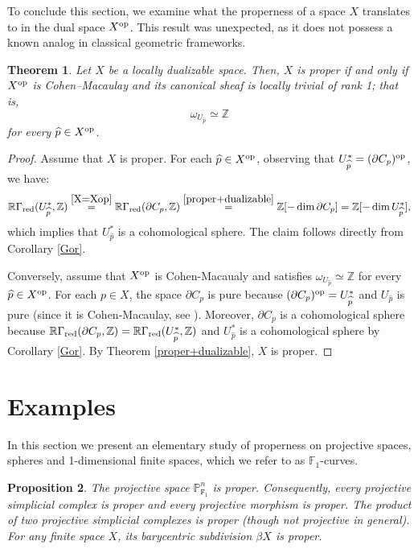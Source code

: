 \documentclass[amssymb,amscd,11pt,20pt]{amsart}
\newcommand{\FF}{{\mathtt F}}
\newcommand{\ZZ}{{\mathbb Z}}
\newcommand{\PP}{\mathbb P}
\newcommand{\RR}{\mathbb R}
\newcommand{\0}{\mathbf 0}
\newcommand{\wh}{\widehat}
\theoremstyle{plain}
\newtheorem{thm}{Theorem}[section]
\newtheorem{prop}[thm]{Proposition}
\numberwithin{equation}{thm}
\begin{document}
To conclude this section, we examine what the properness of a space $X$ translates to in the dual space $X^{\rm op}$.  This result was unexpected,  as it does not possess a known analog in classical geometric frameworks.

\begin{thm}\label{properversusCM} Let $X$ be a locally dualizable space. Then, $X$ is proper if and only if $X^{\text{\rm op}}$ is Cohen--Macaulay and its canonical sheaf is locally trivial of rank 1; that is, $$\omega_{U_{\wh p} }\simeq \ZZ$$ for every $\wh p \in X^{\text{\rm op}}$.
\end{thm}

\begin{proof} Assume that $X$ is proper. For each $\wh p\in X^{\text{\rm op}}$, observing that  $U_{\wh p}^*=(\partial C_p)^{\text{\rm op}}$, we have:
\[ \RR\Gamma_{\text{\rm red}}(U_{\wh p}^*,\ZZ) \overset{\ref{X=Xop}} = \RR\Gamma_{\text{\rm red}}(\partial C_p,\ZZ) \overset{\ref{proper+dualizable} }=\ZZ[-\dim  \partial C_p] = \ZZ[-\dim U_{\wh p}^*],\] which implies that  $U_{\wh p}^*$ is a cohomological sphere.
The claim follows directly from  Corollary \ref{Gor}.

Conversely, assume that $X^{\text{\rm op}}$ is Cohen-Macaualy and satisfies $\omega_{U_{\wh p} }\simeq \ZZ$ for every $\wh p \in X^{\text{\rm op}}$. For each $p\in X$, the space $\partial C_p$ is pure  because $(\partial C_p)^{\text{\rm op}}=U_{\wh p}^*$ and $U_{\wh p}$ is pure (since it is Cohen-Macaulay, see \cite[Thm. 5.18]{ST2}). Moreover, $\partial C_p$ is a cohomological sphere because
$ \RR\Gamma_{\text{\rm red}}(\partial C_p,\ZZ)     =\RR\Gamma_{\text{\rm red}}(U_{\wh p}^*,\ZZ)$ and $U_{\wh p}^*$ is a cohomological sphere by Corollary \ref{Gor}. By Theorem \ref{proper+dualizable}, $X$ is proper.
\end{proof}

\section {Examples}\label{section-examples}

In this section we present an elementary study of properness on projective  spaces, spheres and 1-dimensional finite spaces, which we refer to as $\mathbb{F}_1$-curves.


\begin{prop} The projective space $\PP^n_{\FF_1}$ is proper. Consequently, every projective simplicial complex is proper and every projective morphism is proper. The product of two projective simplicial complexes is proper (though not projective in general). For any finite space $X$, its barycentric subdivision $\beta X$ is proper.
\end{prop}
\end{document}
